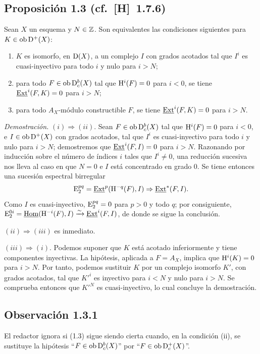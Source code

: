 \subsection*{Proposición 1.3 {\normalfont (cf.~[H]~1.7.6)}}
Sean $X$ un esquema y $N \in \mathbb{Z}$. Son equivalentes las condiciones siguientes para $K \in \operatorname{ob} \mathrm{D}^{+}(X)$:
\begin{enumerate}[label=(\roman*)]
\item $K$ es isomorfo, en $\mathrm{D}(X)$, a un complejo $I$ con grados acotados tal que $I^i$ es cuasi-inyectivo para todo $i$ y nulo para $i > N$;
\item para todo $F \in \operatorname{ob} \mathrm{D}_c^{b}(X)$ tal que $\mathrm{H}^i(F) = 0$ para $i < 0$, se tiene $\underline{\operatorname{Ext}}^i(F,K) = 0$ para $i > N$;
\item para todo $A_X$-módulo constructible $F$, se tiene $\underline{\operatorname{Ext}}^i(F,K) = 0$ para $i > N$.
\end{enumerate}

\emph{Demostración.} $(i) \Rightarrow (ii)$. Sean $F \in \operatorname{ob} \mathrm{D}_c^{b}(X)$ tal que $\mathrm{H}^i(F) = 0$ para $i < 0$, e $I \in \operatorname{ob} \mathrm{D}^{+}(X)$ con grados acotados, tal que $I^i$ es cuasi-inyectivo para todo $i$ y nulo para $i > N$; demostremos que $\underline{\operatorname{Ext}}^i(F,I) = 0$ para $i > N$. Razonando por inducción sobre el número de índices $i$ tales que $I^i \neq 0$, una reducción sucesiva nos lleva al caso en que $N = 0$ e $I$ está concentrado en grado $0$. Se tiene entonces una sucesión espectral birregular
\[
\mathrm{E}_2^{pq} = \underline{\operatorname{Ext}}^p(\mathrm{H}^{-q}(F),I) \Rightarrow \underline{\operatorname{Ext}}^{*}(F,I).
\]
Como $I$ es cuasi-inyectivo, $\mathrm{E}_2^{pq} = 0$ para $p > 0$ y todo $q$; por consiguiente, $\mathrm{E}_2^{0i} = \underline{\operatorname{Hom}}(\mathrm{H}^{-i}(F),I) \xrightarrow{\sim} \underline{\operatorname{Ext}}^i(F,I)$, de donde se sigue la conclusión.

$(ii) \Rightarrow (iii)$ es inmediato.

$(iii) \Rightarrow (i)$. Podemos suponer que $K$ está acotado inferiormente y tiene componentes inyectivas. La hipótesis, aplicada a $F = A_X$, implica que $\mathrm{H}^i(K) = 0$ para $i > N$. Por tanto, podemos sustituir $K$ por un complejo isomorfo $K'$, con grados acotados, tal que $K'^i$ es inyectivo para $i < N$ y nulo para $i > N$. Se comprueba entonces que $K'^N$ es cuasi-inyectivo, lo cual concluye la demostración.

\subsection*{Observación 1.3.1}
El redactor ignora si (1.3) sigue siendo cierta cuando, en la condición (ii), se sustituye la hipótesis ``$F \in \operatorname{ob} \mathrm{D}_c^{b}(X)$'' por ``$F \in \operatorname{ob} \mathrm{D}_c^{+}(X)$''.
